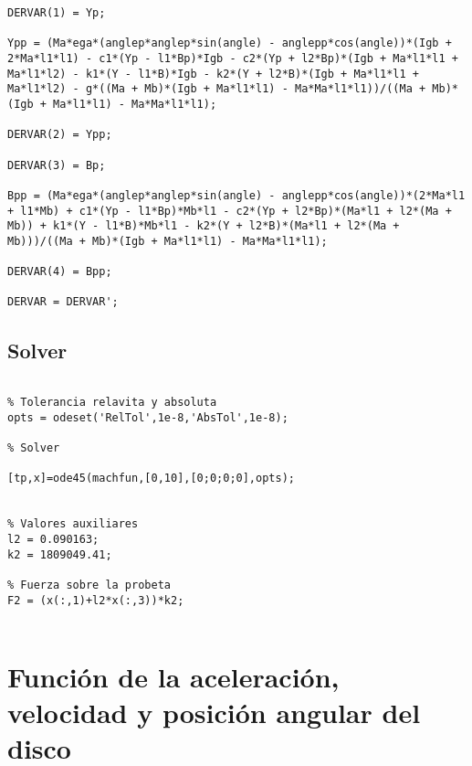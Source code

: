 \begin{lstlisting}
DERVAR(1) = Yp;

Ypp = (Ma*ega*(anglep*anglep*sin(angle) - anglepp*cos(angle))*(Igb + 2*Ma*l1*l1) - c1*(Yp - l1*Bp)*Igb - c2*(Yp + l2*Bp)*(Igb + Ma*l1*l1 + Ma*l1*l2) - k1*(Y - l1*B)*Igb - k2*(Y + l2*B)*(Igb + Ma*l1*l1 + Ma*l1*l2) - g*((Ma + Mb)*(Igb + Ma*l1*l1) - Ma*Ma*l1*l1))/((Ma + Mb)*(Igb + Ma*l1*l1) - Ma*Ma*l1*l1);

DERVAR(2) = Ypp;

DERVAR(3) = Bp;

Bpp = (Ma*ega*(anglep*anglep*sin(angle) - anglepp*cos(angle))*(2*Ma*l1 + l1*Mb) + c1*(Yp - l1*Bp)*Mb*l1 - c2*(Yp + l2*Bp)*(Ma*l1 + l2*(Ma + Mb)) + k1*(Y - l1*B)*Mb*l1 - k2*(Y + l2*B)*(Ma*l1 + l2*(Ma + Mb)))/((Ma + Mb)*(Igb + Ma*l1*l1) - Ma*Ma*l1*l1);

DERVAR(4) = Bpp;

DERVAR = DERVAR';

\end{lstlisting}


\subsection{Solver}
\label{sec:solver_part}

\begin{lstlisting}

% Tolerancia relavita y absoluta
opts = odeset('RelTol',1e-8,'AbsTol',1e-8);		

% Solver

[tp,x]=ode45(machfun,[0,10],[0;0;0;0],opts);


% Valores auxiliares
l2 = 0.090163;				
k2 = 1809049.41;			

% Fuerza sobre la probeta
F2 = (x(:,1)+l2*x(:,3))*k2;						


\end{lstlisting}

\section{Función de la aceleración, velocidad y posición angular del disco}
\label{sec:phi_fun}

